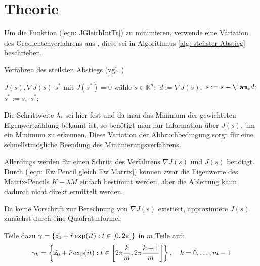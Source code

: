 \documentclass[a4paper,12pt]{report}
\newcommand{\R}{\mathbb R}
\newcommand{\1}{\mathds{1}}
\theoremstyle{plain} %
\theoremstyle{definition} %
\theoremstyle{remark}
\begin{document}
      \section{Theorie}
            Um die Funktion (\ref{eqn: JGleichIntTr}) zu minimieren, verwende eine Variation des Gradientenverfahrens
            aus \cite[S. 285]{optimierungBurkhard}, diese sei in Algorithmus \ref{alg: steilster Abstieg} beschrieben.
            \begin{algorithm}[h!t]
                  \caption{Verfahren des steilsten Abstiegs (vgl. \cite[S. 285]{optimierungBurkhard})}
                  \label{alg: steilster Abstieg}

                  \begin{algorithmic}
                        \Require $J(s), \nabla J(s)$
                        \Ensure $s^*$ mit $J(s^*)=0$
                        \State wähle $s\in \R^n;$
                        \Repeat
                              \State $d:=\nabla J(s);$
                              \State $s:=s-\lam_*d;$
                        \State $s^*:=s;$
                        \Return $s^*;$
                  \end{algorithmic}
            \end{algorithm}

            Die Schrittweite $\lambda_*$ sei hier fest und da man das Minimum der gewichteten Eigenwertzählung bekannt ist,
            so benötigt man nur Information über $J(s)$, um ein Minimum zu erkennen.
            Diese Variation der Abbruchbedingung sorgt für eine schnellstmögliche Beendung des Minimierungsverfahrens.

            Allerdings werden für einen Schritt des Verfahrens $\nabla J(s)$ und $J(s)$ benötigt.
            Durch (\ref{eqn: Ew Pencil gleich Ew Matrix}) können zwar die Eigenwerte des Matrix-Pencils $K-\lambda M$ einfach bestimmt werden,
            aber die Ableitung kann dadurch nicht direkt ermittelt werden.

            Da keine Vorschrift zur Berechnung von $\nabla J(s)$ existiert, approximiere $J(s)$ zunächst durch eine Quadraturformel.

            Teile dazu $\gamma = \{\Tilde{z_0}+\Tilde r\exp(it): t\in [0,2\pi]\}$ in $m$ Teile auf:
            \begin{equation}
                  \label{def: gamma_k}
                  \gamma_k = \left\{\Tilde{z_0}+\Tilde r\exp(it): t\in \left[ 2\pi \frac k m, 2\pi \frac {k+1} m\right]\right\},\quad k=0,\dots,m-1
            \end{equation}
\end{document}
